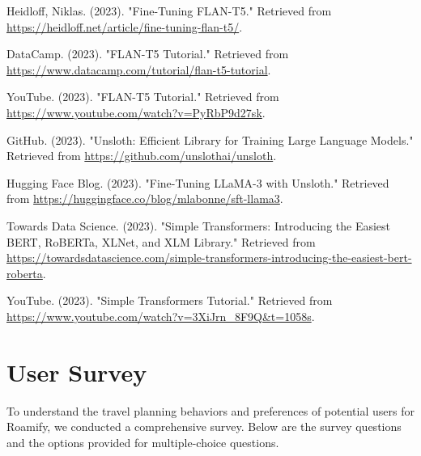 \documentclass[sigconf,authordraft]{acmart}
\begin{document}
\begin{thebibliography}{99}
        Heidloff, Niklas. (2023). "Fine-Tuning FLAN-T5." Retrieved from \url{https://heidloff.net/article/fine-tuning-flan-t5/}.

        DataCamp. (2023). "FLAN-T5 Tutorial." Retrieved from \url{https://www.datacamp.com/tutorial/flan-t5-tutorial}.

        YouTube. (2023). "FLAN-T5 Tutorial." Retrieved from \url{https://www.youtube.com/watch?v=PyRbP9d27sk}.

        GitHub. (2023). "Unsloth: Efficient Library for Training Large Language Models." Retrieved from \url{https://github.com/unslothai/unsloth}.

        Hugging Face Blog. (2023). "Fine-Tuning LLaMA-3 with Unsloth." Retrieved from \url{https://huggingface.co/blog/mlabonne/sft-llama3}.

        Towards Data Science. (2023). "Simple Transformers: Introducing the Easiest BERT, RoBERTa, XLNet, and XLM Library." Retrieved from \url{https://towardsdatascience.com/simple-transformers-introducing-the-easiest-bert-roberta}.

        YouTube. (2023). "Simple Transformers Tutorial." Retrieved from \url{https://www.youtube.com/watch?v=3XiJrn_8F9Q&t=1058s}.

\end{thebibliography}

\newpage

\appendix

\section{User Survey}
    To understand the travel planning behaviors and preferences of potential users for Roamify, we conducted a comprehensive survey. Below are the survey questions and the options provided for multiple-choice questions.
    \\
\end{document}
